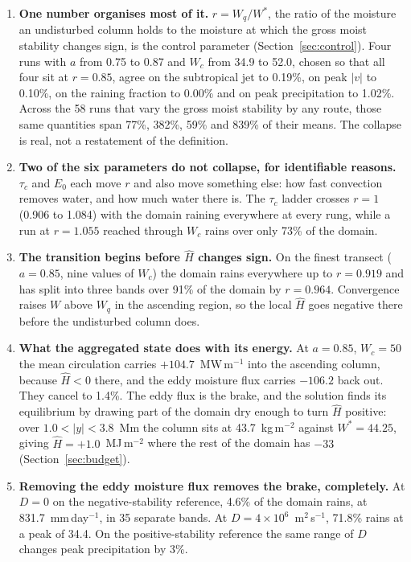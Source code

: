 \documentclass[11pt]{article}
\newcommand{\Hhat}{\hat{H}}
\newcommand{\Wstar}{W^{*}}
\newcommand{\Wq}{W_q}
\newcommand{\mmday}{mm\,day$^{-1}$}
\begin{document}
\begin{enumerate}

\item \textbf{One number organises most of it.} $r = \Wq/\Wstar$, the ratio of
the moisture an undisturbed column holds to the moisture at which the gross
moist stability changes sign, is the control parameter
(Section~\ref{sec:control}). Four runs with $a$ from 0.75 to 0.87 and $W_c$ from
34.9 to 52.0, chosen so that all four sit at $r = 0.85$, agree on the
subtropical jet to 0.19\%, on peak $|v|$ to 0.10\%, on the raining fraction to
0.00\% and on peak precipitation to 1.02\%. Across the 58 runs that vary the
gross moist stability by any route, those same quantities span 77\%, 382\%, 59\%
and 839\% of their means. The collapse is real, not a restatement of the
definition.

\item \textbf{Two of the six parameters do not collapse, for identifiable
reasons.} $\tau_c$ and $E_0$ each move $r$ and also move something else: how
fast convection removes water, and how much water there is. The $\tau_c$ ladder
crosses $r = 1$ (0.906 to 1.084) with the domain raining everywhere at every
rung, while a run at $r = 1.055$ reached through $W_c$ rains over only 73\% of
the domain.

\item \textbf{The transition begins before $\Hhat$ changes sign.} On the finest
transect ($a = 0.85$, nine values of $W_c$) the domain rains everywhere up to
$r = 0.919$ and has split into three bands over 91\% of the domain by
$r = 0.964$. Convergence raises $W$ above $\Wq$ in the ascending region, so the
local $\Hhat$ goes negative there before the undisturbed column does.

\item \textbf{What the aggregated state does with its energy.} At $a = 0.85$,
$W_c = 50$ the mean circulation carries $+104.7$~MW\,m$^{-1}$ into the
ascending column, because $\Hhat < 0$ there, and the eddy moisture flux carries
$-106.2$ back out. They cancel to 1.4\%. The eddy flux is the brake, and the
solution finds its equilibrium by drawing part of the domain dry enough to turn
$\Hhat$ positive: over $1.0 < |y| < 3.8$~Mm the column sits at
43.7~kg\,m$^{-2}$ against $\Wstar = 44.25$, giving $\Hhat = +1.0$~MJ\,m$^{-2}$
where the rest of the domain has $-33$ (Section~\ref{sec:budget}).

\item \textbf{Removing the eddy moisture flux removes the brake, completely.}
At $D = 0$ on the negative-stability reference, 4.6\% of the domain rains, at
831.7~\mmday, in 35 separate bands. At $D = 4\times10^{6}$~m$^2$\,s$^{-1}$,
71.8\% rains at a peak of 34.4. On the positive-stability reference the same
range of $D$ changes peak precipitation by 3\%.


\end{enumerate}
\end{document}
